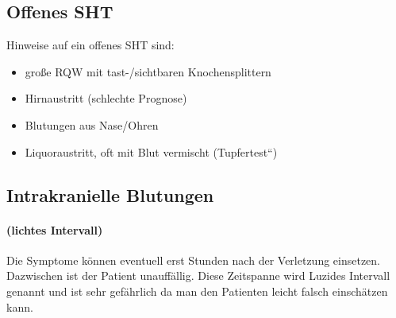 \subsection{Offenes SHT}

Hinweise auf ein offenes SHT sind:

\begin{itemize}
    \item gro{\ss}e RQW mit tast-/sichtbaren  Knochensplittern
    \item Hirnaustritt (schlechte Prognose)
    \item Blutungen aus Nase/Ohren
    \item Liquoraustritt, oft mit Blut vermischt
    ({\quotedblbase}Tupfertest{\textquotedblleft})
\end{itemize}



\subsection{Intrakranielle Blutungen}

\paragraph{ (lichtes Intervall)}

Die Symptome können eventuell erst Stunden nach der
Verletzung einsetzen. Dazwischen ist der Patient unauffällig.
Diese Zeitspanne wird Luzides Intervall genannt und ist
sehr gefährlich da man den Patienten leicht falsch
einschätzen kann.

